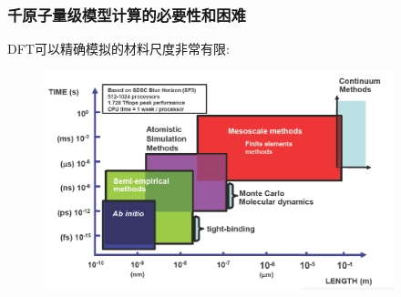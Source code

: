 \begin{frame}
	\frametitle{千原子量级模型计算的必要性和困难}
	\textrm{DFT}可以精确模拟的材料尺度非常有限:
\begin{figure}[h!]
\includegraphics[height=2.50in,width=4.00in]{Figures/Multi-Scale-6.png}
\label{Multi-Scale-3}
\end{figure}
\end{frame}

